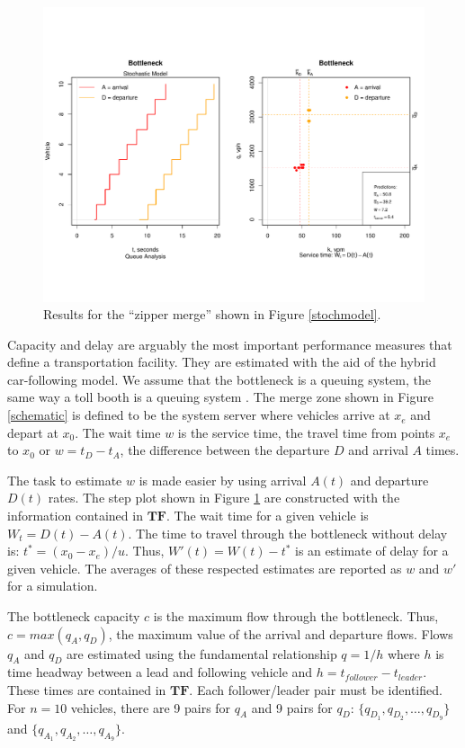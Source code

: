 \documentclass[Proceedings]{ascelike}
\begin{document}
\begin{figure}
\centering
\includegraphics[width = 5.5in]{Rplot05.pdf}
\caption{Results for the  ``zipper merge'' shown in Figure \ref{stochmodel}.}
\label{bbmodelAD}
\end{figure}

Capacity and delay are arguably the most important performance measures that define a transportation facility. They are estimated with the aid of the hybrid car-following model. We assume that the bottleneck is a queuing system, the same way a toll booth is a queuing system \cite{banks:1998}. The merge zone shown in Figure \ref{schematic} is defined to be the system server where vehicles arrive at $x_e$ and depart at $x_0$. The wait  time $w$ is the service time, the  travel time from points $x_e$ to $x_0$ or  $w = t_D - t_A$, the difference between the departure $D$ and arrival $A$ times. 

The task to estimate $w$  is made easier by using arrival  $A(t)$ and departure $D(t)$ rates.  The step plot shown in Figure \ref{bbmodelAD} are constructed with the information contained in $\mathbf{TF}$. The wait time for a given vehicle is $W_t = D(t) - A(t)$. The  time to travel through the bottleneck without delay is: $t^* = (x_0 - x_e)/u$.  Thus, $W'(t) = W(t) - t^*$ is an estimate of delay for a given vehicle. The averages of these respected estimates are reported as $w$ and $w'$ for a simulation.


The bottleneck capacity $c$ is the maximum flow through the bottleneck. Thus, $c = max(q_A,q_D)$, the maximum value of the arrival and departure flows.  Flows $q_A$ and  $q_D$ are estimated using the fundamental relationship $q = 1/h$ where $h$ is time headway between a lead and following vehicle and $h = t_{follower} - t_{leader}$. These times are contained in  $\mathbf{TF}$. Each follower/leader pair must be identified. For $n = 10$ vehicles, there are 9 pairs for $q_A$  and 9 pairs for $q_D$: $\{q_{D_1},q_{D_2},\ldots,q_{D_9}\}$ and $\{q_{A_1},q_{A_2},\ldots,q_{A_9}\}$.
\end{document}
